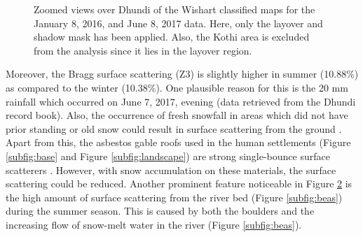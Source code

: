 \documentclass[review]{elsarticle}
\numberwithin{equation}{section}
\numberwithin{figure}{section}
\numberwithin{table}{section}
\begin{document}
\begin{figure}[htb]
    \centering
    \begin{subfigure}[t]{\textwidth}
        \caption{}
        \label{subfig:wishart_jan}
    \end{subfigure}
    \begin{subfigure}[t]{\textwidth}
        \caption{}
        \label{subfig:wishart_jun}
    \end{subfigure}
    \caption{Zoomed views over Dhundi of the Wishart classified maps for the  January 8, 2016, and  June 8, 2017 data. Here, only the layover and shadow mask has been applied. Also, the Kothi area is excluded from the analysis since it lies in the layover region.}
    \label{fig:wishart_res}
\end{figure}

Moreover, the Bragg surface scattering (Z3) is slightly higher in summer (10.88\%) as compared to the winter (10.38\%). One plausible reason for this is the 20 mm rainfall which occurred on June 7, 2017, evening (data retrieved from the Dhundi record book). Also, the occurrence of fresh snowfall in areas which did not have prior standing or old snow could result in surface scattering from the ground \citep{Leinss2014}. Apart from this, the asbestos gable roofs used in the human settlements (Figure \ref{subfig:base} and Figure \ref{subfig:landscape}) are strong single-bounce surface scatterers \citep{Brunner2009}. However, with snow accumulation on these materials, the surface scattering could be reduced. Another prominent feature noticeable in Figure \ref{subfig:wishart_jun} is the high amount of surface scattering from the river bed (Figure \ref{subfig:beas}) during the summer season. This is caused by both the boulders and the increasing flow of snow-melt water in the river (Figure \ref{subfig:beas}).
\end{document}
